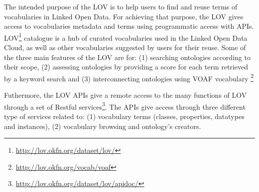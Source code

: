 The intended purpose of the LOV \cite{vandenbusschelov} is to help users to find and reuse terms of vocabularies in Linked Open Data. For achieving that purpose, the LOV gives access to vocabularies metadata and terms using programmatic access with APIs.  
LOV\footnote{\url{http://lov.okfn.org/dataset/lov/}} catalogue  is a hub of curated vocabularies used in the Linked Open Data Cloud, as well as other vocabularies suggested by users for their reuse. 
Some of the three main features of the LOV are for: (1) searching ontologies according to their scope, (2) assessing ontologies by providing a score for each term retrieved by a keyword search and (3) interconnecting ontologies using VOAF vocabulary \footnote{\url{http://lov.okfn.org/vocab/voaf}}


Futhermore, the LOV APIs give a remote access to the many functions of LOV through a set of Restful services\footnote{\url{http://lov.okfn.org/dataset/lov/apidoc/}}. %
The APIs give access through three different type of services related to: (1) vocabulary terms (classes, properties, datatypes and instances), (2) vocabulary browsing and ontology's creators. 



